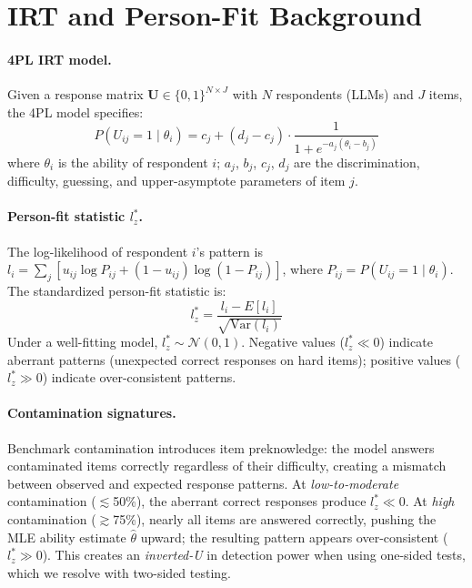\documentclass[11pt,a4paper]{article}
\begin{document}
\section{IRT and Person-Fit Background}

\paragraph{4PL IRT model.}
Given a response matrix $\mathbf{U} \in \{0,1\}^{N \times J}$ with $N$ respondents (LLMs) and $J$ items, the 4PL model specifies:
\begin{equation}
P(U_{ij}=1 \mid \theta_i) = c_j + (d_j - c_j) \cdot \frac{1}{1 + e^{-a_j(\theta_i - b_j)}}
\end{equation}
where $\theta_i$ is the ability of respondent $i$; $a_j$, $b_j$, $c_j$, $d_j$ are the discrimination, difficulty, guessing, and upper-asymptote parameters of item $j$.

\paragraph{Person-fit statistic $l_z^*$.}
The log-likelihood of respondent $i$'s pattern is $l_i = \sum_j [u_{ij} \log P_{ij} + (1{-}u_{ij})\log(1{-}P_{ij})]$, where $P_{ij} = P(U_{ij}{=}1\mid\theta_i)$.
The standardized person-fit statistic is:
\begin{equation}
l_z^* = \frac{l_i - E[l_i]}{\sqrt{\text{Var}(l_i)}}
\end{equation}
Under a well-fitting model, $l_z^* \sim \mathcal{N}(0,1)$.
Negative values ($l_z^* \ll 0$) indicate aberrant patterns (unexpected correct responses on hard items); positive values ($l_z^* \gg 0$) indicate over-consistent patterns.

\paragraph{Contamination signatures.}
Benchmark contamination introduces item preknowledge: the model answers contaminated items correctly regardless of their difficulty, creating a mismatch between observed and expected response patterns.
At \emph{low-to-moderate} contamination ($\lesssim$50\%), the aberrant correct responses produce $l_z^* \ll 0$.
At \emph{high} contamination ($\gtrsim$75\%), nearly all items are answered correctly, pushing the MLE ability estimate $\hat{\theta}$ upward; the resulting pattern appears over-consistent ($l_z^* \gg 0$).
This creates an \emph{inverted-U} in detection power when using one-sided tests, which we resolve with two-sided testing.
\end{document}
